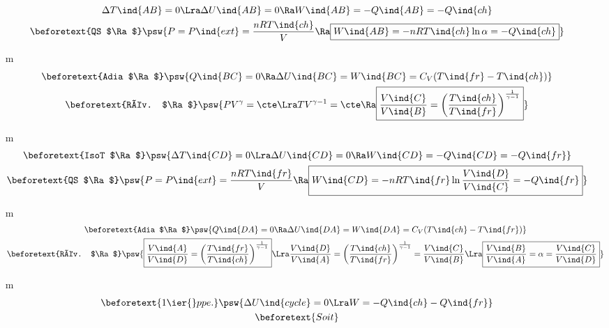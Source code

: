\documentclass[../../main/main.tex]{subfiles}
\begin{document}
\begin{tcb*}[breakable]
\begin{enumerate}[label=\sqenumi]
\begin{gather*}
{					\Delta{T}\ind{AB} = 0
					\Lra
					\Delta{U}\ind{AB} = 0
					\Ra
					W\ind{AB} = - Q\ind{AB} = -Q\ind{ch}
				}%
				\\\beforetext{QS $\Ra$}
				\psw{%
					P = P\ind{ext} = \frac{nRT\ind{ch}}{V}
					\Ra
					\boxed{W\ind{AB} = -nRT\ind{ch}\ln \alpha = -Q\ind{ch}}
				}%
			\end{gather*}
			\vspace{\fill}
		\item[m]
			\begin{gather*}
				\beforetext{Adia $\Ra$}
				\psw{%
					Q\ind{BC} = 0
					\Ra
					\Delta{U}\ind{BC} = W\ind{BC} = C_V (T\ind{fr} - T\ind{ch})
				}%
				\\\beforetext{Rév. $\Ra$}
				\psw{%
				PV^{\gamma} = \cte
				\Lra
				TV^{\gamma-1} = \cte
				\Ra
				\boxed{\frac{V\ind{C}}{V\ind{B}} =
				\left( \frac{T\ind{ch}}{T\ind{fr}} \right)^{\frac{1}{\gamma-1}}}
				}%
			\end{gather*}
			\pagebreak
		\item[m]
			\begin{gather*}
				\beforetext{IsoT $\Ra$}
				\psw{%
					\Delta{T}\ind{CD} = 0
					\Lra
					\Delta{U}\ind{CD} = 0
					\Ra
					W\ind{CD} = - Q\ind{CD} = -Q\ind{fr}
				}%
				\\\beforetext{QS $\Ra$}
				\psw{%
					P = P\ind{ext} = \frac{nRT\ind{fr}}{V}
					\Ra
					\boxed{W\ind{CD} = -nRT\ind{fr}\ln \frac{V\ind{D}}{V\ind{C}} = -Q\ind{fr}}
				}%
			\end{gather*}
		\item[m]
			\begin{gather*}
				\beforetext{Adia $\Ra$}
				\psw{%
					Q\ind{DA} = 0
					\Ra
					\Delta{U}\ind{DA} = W\ind{DA} = C_V (T\ind{ch} - T\ind{fr})
				}%
				\\\beforetext{Rév. $\Ra$}
				\psw{%
				\boxed{\frac{V\ind{A}}{V\ind{D}} =
				\left( \frac{T\ind{fr}}{T\ind{ch}} \right)^{\frac{1}{\gamma-1}}}
				\Lra
				\frac{V\ind{D}}{V\ind{A}} =
				\left( \frac{T\ind{ch}}{T\ind{fr}} \right)^{\frac{1}{\gamma-1}} =
				\frac{V\ind{C}}{V\ind{B}}
				\Lra
				\boxed{\frac{V\ind{B}}{V\ind{A}} = \alpha = \frac{V\ind{C}}{V\ind{D}}}
				}%
			\end{gather*}
		\item[m]
			\begin{gather*}
				\beforetext{1\ier{} ppe.}
				\psw{%
					\Delta{U}\ind{cycle} = 0
					\Lra
					W = -Q\ind{ch} - Q\ind{fr}
				}%
				\\\beforetext{Soit}

\end{gather*}
\end{enumerate}
\end{tcb*}
\end{document}
